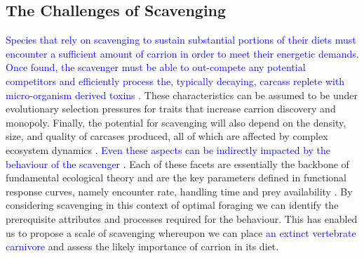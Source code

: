 \documentclass[a4paper,12pt]{article}
\begin{document}
\subsection{The Challenges of Scavenging} 

\textcolor{blue}{Species that rely on scavenging to sustain substantial portions of their diets must encounter a sufficient amount of carrion in order to meet their energetic demands.
Once found, the scavenger must be able to out-compete any potential competitors and efficiently process the, typically decaying, carcass replete with micro-organism derived toxins \citep{ruxton2014fruit}.}
These characteristics can be assumed to be under evolutionary selection pressures for traits that increase carrion discovery and monopoly.
Finally, the potential for scavenging will also depend on the density, size, and quality of carcases produced, all of which are affected by complex ecosystem dynamics \textcolor{blue}{\citep{moleon2014inter}. 
Even these aspects can be indirectly impacted by the behaviour of the scavenger \citep{moleon2014inter}.}
Each of these facets are essentially the backbone of fundamental ecological theory and are the key parameters defined in functional response curves, namely encounter rate, handling time and prey availability \citep{jeschke2002predator}.  
By considering scavenging in this context of optimal foraging we can identify the prerequisite attributes and processes required for the behaviour. 
This has enabled us to propose a scale of scavenging whereupon we can place \textcolor{blue}{an extinct vertebrate carnivore} and assess the likely importance of carrion in its diet. 
\end{document}
